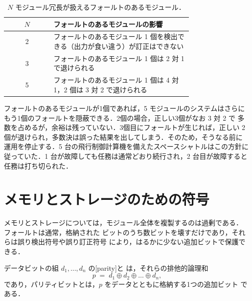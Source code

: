 \documentclass[../main.tex]{subfiles}
\begin{document}
\begin{table}[htbp]
  \centering\small
  \caption{$N$ モジュール冗長が扱えるフォールトのあるモジュール．}
  \label{tab:l17-nmr}
  \begin{tabular}{@{}cp{0.75\linewidth}@{}}
    \toprule
    $N$ & フォールトのあるモジュールの影響 \\
    \midrule
    2 & フォールトのあるモジュール 1 個を検出できる（出力が食い違う）が訂正はできない \\
    3 & フォールトのあるモジュール 1 個は 2 対 1 で退けられる \\
    5 & フォールトのあるモジュール 1 個は 4 対 1，2 個は 3 対 2 で退けられる \\
    \bottomrule
  \end{tabular}
\end{table}

フォールトのあるモジュールが1個であれば，5 モジュールのシステムはさらに
もう1個のフォールトを隠蔽できる．2個の場合，正しい3個がなお 3 対 2 で
多数を占めるが，余裕は残っていない．3個目にフォールトが生じれば，正しい
2個が退けられ，多数決は誤った結果を出してしまう．そのため，そうなる前に
運用を停止する．5 台の飛行制御計算機を備えたスペースシャトルはこの方針に
従っていた．1 台が故障しても任務は通常どおり続行され，2 台目が故障すると
任務は打ち切られた．

\section{メモリとストレージのための符号}
\label{sec:l17-codes}

メモリとストレージについては，モジュール全体を複製するのは過剰である．
フォールトは通常，格納された
ビットのうち数ビットを壊すだけであり，それらは誤り検出符号や誤り訂正符号
により，はるかに少ない追加ビットで保護できる．

\begin{definition}[パリティ]
  データビットの組 $d_1,\dots,d_n$ の[parity]と
  は，それらの排他的論理和
  \begin{equation}
    p \;=\; d_1 \oplus d_2 \oplus \dots \oplus d_n ,
    \label{eq:l17-parity}
  \end{equation}
  であり，パリティビットとは，$p$ をデータとともに格納する1つの追加ビット
  である．
\end{definition}
\end{document}
